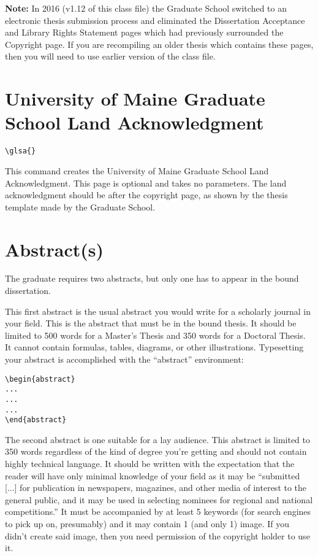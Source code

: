 \textbf{Note:} In 2016 (v1.12 of this class file) the Graduate School switched to an electronic thesis submission process and eliminated the Dissertation Acceptance and Library Rights Statement pages which had previously surrounded the Copyright page.  If you are recompiling an older thesis which contains these pages, then you will need to use earlier version of the class file.

\section{University of Maine Graduate School Land Acknowledgment}\label{glsa}
\begin{verbatim}
\glsa{}
\end{verbatim}

This command creates the University of Maine Graduate School Land Acknowledgment. This page is optional and takes no parameters. The land acknowledgment should be after the copyright page, as shown by the thesis template made by the Graduate School. 

\section{Abstract(s)}\label{abstracts}
The graduate requires two abstracts, but only one has to appear in the bound dissertation.

This first abstract is the usual abstract you would write for a scholarly journal in your field.  This is the abstract that must be in the bound thesis.  It should be limited to 500 words for a Master's Thesis and 350 words for a Doctoral Thesis.  It cannot contain formulas, tables, diagrams, or other illustrations.  Typesetting your abstract is accomplished with the ``abstract'' environment:
\begin{verbatim}
\begin{abstract}
...
...
...
\end{abstract}
\end{verbatim}

The second abstract is one suitable for a lay audience.  This abstract is limited to 350 words regardless of the kind of degree you're getting and should not contain highly technical language.  It should be written with the expectation that the reader will have only minimal knowledge of your field as it may be ``submitted [...] for publication in newspapers, magazines, and other media of
interest to the general public, and it may be used in selecting nominees for regional and
national competitions.''  It must be accompanied by at least 5 keywords (for search engines to pick up on, presumably) and it may contain 1 (and only 1) image.  If you didn't create said image, then you need permission of the copyright holder to use it.

